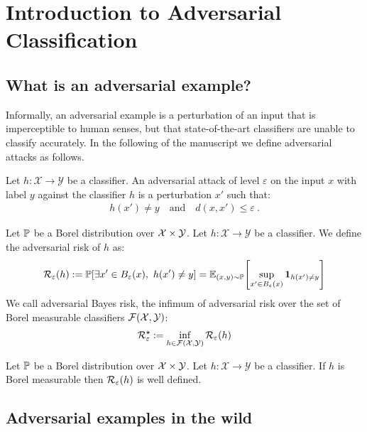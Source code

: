 
\section{Introduction to Adversarial Classification}
\subsection{What is an adversarial example?}

Informally, an adversarial example is a perturbation of an input that is imperceptible to human senses, but that state-of-the-art classifiers are unable to  classify accurately. In the following of the manuscript we define adversarial attacks as follows.


\begin{definition} 
    Let $h:\mathcal{X}\to\mathcal{Y}$ be a classifier. An adversarial attack of level $\varepsilon$ on the input $x$ with label $y$ against the classifier $h$ is a perturbation $x'$ such that:
    \begin{align*}
        h(x')\neq y\quad\text{and}\quad d(x,x')\leq\varepsilon~.
    \end{align*}
\end{definition}


\begin{definition}
  Let $\mathbb{P}$ be a Borel distribution over $\mathcal{X} \times \mathcal{Y}$. Let $h:\mathcal{X}\to\mathcal{Y}$ be a classifier. We define the adversarial risk of $h$ as:
  \begin{align*}
    \risk_\varepsilon(h):=\PP\left[\exists x'\in B_\varepsilon(x),~h(x')\neq y\right] = \mathbb{E}_{(x,y)\sim\PP}\left[\sup_{x'\in B_\varepsilon(x)}\mathbf{1}_{h(x')\neq y}\right]
  \end{align*}
We call adversarial Bayes risk, the infimum of adversarial risk over the set of Borel measurable classifiers $\mathcal{F}(\mathcal{X},\mathcal{Y})$:
\begin{align*}
  \mathcal{R}^\star_\varepsilon:=\inf_{h\in\mathcal{F}(\mathcal{X},\mathcal{Y})} \mathcal{R}_\varepsilon(h)
\end{align*}

\end{definition}

\begin{prop}
  Let $\mathbb{P}$ be a Borel distribution over $\mathcal{X} \times \mathcal{Y}$. Let $h:\mathcal{X}\to\mathcal{Y}$ be a classifier. If $h$ is Borel measurable then $\mathcal{R}_\varepsilon(h)$ is well defined.
\end{prop}

\subsection{Adversarial examples in the wild}

